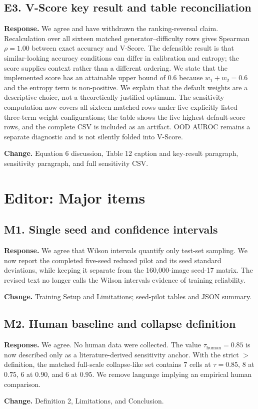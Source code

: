 \documentclass[11pt]{article}
\newcommand{\response}[1]{\par\noindent\textbf{Response.} #1\par}
\newcommand{\change}[1]{\par\noindent\textbf{Change.} #1\par}
\begin{document}
\subsection*{E3. V-Score key result and table reconciliation}
\response{We agree and have withdrawn the ranking-reversal claim. Recalculation over all sixteen matched generator--difficulty rows gives Spearman $\rho=1.00$ between exact accuracy and V-Score. The defensible result is that similar-looking accuracy conditions can differ in calibration and entropy; the score supplies context rather than a different ordering. We state that the implemented score has an attainable upper bound of 0.6 because $w_1+w_2=0.6$ and the entropy term is non-positive. We explain that the default weights are a descriptive choice, not a theoretically justified optimum. The sensitivity computation now covers all sixteen matched rows under five explicitly listed three-term weight configurations; the table shows the five highest default-score rows, and the complete CSV is included as an artifact. OOD AUROC remains a separate diagnostic and is not silently folded into V-Score.}
\change{Equation 6 discussion, Table 12 caption and key-result paragraph, sensitivity paragraph, and full sensitivity CSV.}

\section*{Editor: Major items}
\subsection*{M1. Single seed and confidence intervals}
\response{We agree that Wilson intervals quantify only test-set sampling. We now report the completed five-seed reduced pilot and its seed standard deviations, while keeping it separate from the 160,000-image seed-17 matrix. The revised text no longer calls the Wilson intervals evidence of training reliability.}
\change{Training Setup and Limitations; seed-pilot tables and JSON summary.}

\subsection*{M2. Human baseline and collapse definition}
\response{We agree. No human data were collected. The value $\tau_{\mathrm{human}}=0.85$ is now described only as a literature-derived sensitivity anchor. With the strict $>$ definition, the matched full-scale collapse-like set contains 7 cells at $\tau=0.85$, 8 at $0.75$, 6 at $0.90$, and 6 at $0.95$. We remove language implying an empirical human comparison.}
\change{Definition 2, Limitations, and Conclusion.}
\end{document}
